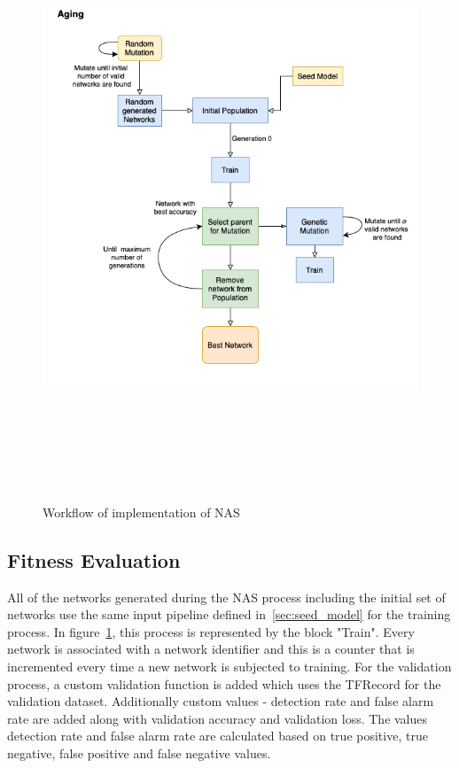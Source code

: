 \begin{figure}[htbp]
    \centering
    \includegraphics[width=1.0\linewidth, height=18cm]{BachelorMasterThesis/ApproachAndImplementation/Figures/Aging.png}
    \caption{Workflow of implementation of NAS}
    \label{fig:nas_implementation}
\end{figure}

\subsection{Fitness Evaluation}
\label{sec:fitness_evaluation}

All of the networks generated during the NAS process including the initial set of networks use the same input pipeline defined in~\autoref{sec:seed_model} for the training process. In figure~\ref{fig:nas_implementation}, this process is represented by the block "Train". Every network is associated with a network identifier and this is a counter that is incremented every time a new network is subjected to training. 
For the validation process, a custom validation function is added which uses the TFRecord for the validation dataset. Additionally custom values - detection rate and false alarm rate are added along with validation accuracy and validation loss. The values detection rate and false alarm rate are calculated based on true positive, true negative, false positive and false negative values. 

